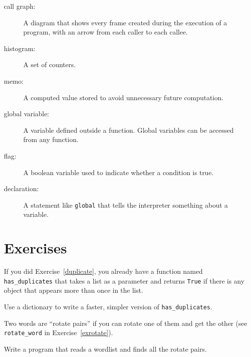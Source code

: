 \documentclass[10pt]{book}
\begin{document}
\begin{description}
\item[call graph:] A diagram that shows every frame created during
the execution of a program, with an arrow from each caller to
each callee. 

\item[histogram:] A set of counters.

\item[memo:] A computed value stored to avoid unnecessary future 
computation.

\item[global variable:]  A variable defined outside a function.  Global
variables can be accessed from any function.

\item[flag:] A boolean variable used to indicate whether a condition
is true.

\item[declaration:] A statement like {\tt global} that tells the
interpreter something about a variable.

\end{description}

\section{Exercises}

\begin{ex}

If you did Exercise~\ref{duplicate}, you already have
a function named \verb"has_duplicates" that takes a list
as a parameter and returns {\tt True} if there is any object
that appears more than once in the list.

Use a dictionary to write a faster, simpler version of
\verb"has_duplicates".
\end{ex}


\begin{ex}
\label{exrotatepairs}


Two words are ``rotate pairs'' if you can rotate one of them
and get the other (see \verb"rotate_word" in Exercise~\ref{exrotate}).

Write a program that reads a wordlist and finds all the rotate
pairs.
\end{ex}
\end{document}
